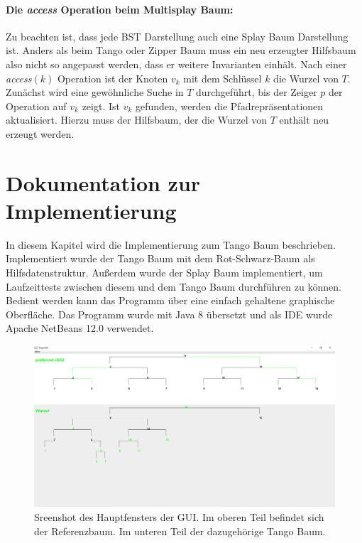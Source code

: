 \documentclass[a4paper,12pt]{article}
\begin{document}
\paragraph{Die \textit{access} Operation beim Multisplay Baum:}
Zu beachten ist, dass jede BST Darstellung auch eine Splay Baum Darstellung ist. Anders als beim Tango oder Zipper Baum muss ein neu erzeugter Hilfsbaum also nicht so angepasst werden, dass er weitere Invarianten einhält.  Nach einer \textit{access}$\left(k\right)$ Operation ist der Knoten $v_k$ mit dem Schlüssel $k$ die Wurzel von $T$. Zunächst wird eine gewöhnliche Suche in $T$ durchgeführt, bis der Zeiger $p$ der Operation auf $v_k$ zeigt. Ist $v_k$ gefunden, werden die Pfadrepräsentationen aktualisiert. Hierzu muss der Hilfsbaum, der die Wurzel von $T$ enthält neu erzeugt werden. \\

\section{Dokumentation zur Implementierung}
In diesem Kapitel wird die Implementierung zum Tango Baum beschrieben. 
Implementiert wurde der Tango Baum mit dem Rot-Schwarz-Baum als Hilfsdatenstruktur. Außerdem wurde der Splay Baum implementiert, um Laufzeittests zwischen diesem und dem Tango Baum durchführen zu können. Bedient werden kann das Programm über eine einfach gehaltene graphische Oberfläche. Das Programm wurde mit Java 8 übersetzt und als IDE wurde Apache NetBeans 12.0 verwendet. 
\begin{figure}[H]
	\centering
	\includegraphics[width= 1\textwidth]{Medien/laufzeittest/MainGUI}
	\caption{Sreenshot des Hauptfensters der GUI. Im oberen Teil befindet sich der Referenzbaum. Im unteren Teil der dazugehörige Tango Baum.}
	\label{fig:TangoBaumGui}
\end{figure}
\end{document}
